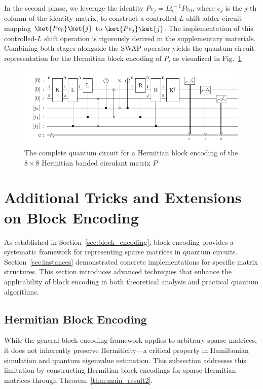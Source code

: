 \documentclass{article}
\begin{document}
    In the second phase, we leverage the identity $ Pe_j = L_n^{j-1} Pe_0 $, where $ e_j $ is the $ j $-th column of the identity matrix, to construct a controlled-$ L $ shift adder circuit mapping $ \ket{Pe_0} \ket{j} $ to $ \ket{Pe_j} \ket{j}$. The implementation of this controlled-$ L $ shift operation is rigorously derived in the supplementary materials. Combining both stages alongside the SWAP operator yields the quantum circuit representation for the Hermitian block encoding of $ P $, as visualized in Fig.~\ref{fig:direct_circuit}

    \begin{figure}[htbp]
        \centering
        \includegraphics{pdf/direct_encode}
        \caption{
            The complete quantum circuit for a Hermitian block encoding of the $8\times 8$
            Hermitian banded circulant matrix $P$
        }
        \label{fig:direct_circuit}
    \end{figure}


    \section{Additional Tricks and Extensions on Block Encoding}

    As established in Section~\ref{sec:block_encoding}, block encoding provides a systematic framework for representing sparse matrices in quantum circuits. Section~\ref{sec:instances} demonstrated concrete implementations for specific matrix structures. This section introduces advanced techniques that enhance the applicability of block encoding in both theoretical analysis and practical quantum algorithms.

    \subsection{Hermitian Block Encoding}

    While the general block encoding framework applies to arbitrary sparse matrices, it does not inherently preserve Hermiticity—a critical property in Hamiltonian simulation and quantum eigenvalue estimation. This subsection addresses this limitation by constructing Hermitian block encodings for sparse Hermitian matrices through Theorem~\ref{thm:main_result2}.
\end{document}

